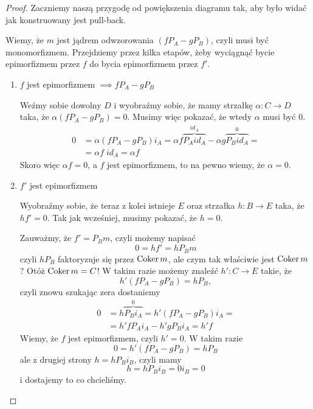 \begin{proof}
  Zaczniemy naszą przygodę od powiększenia diagramu tak, aby było widać jak konstruowany jest pull-back.

  \begin{center}\end{center}
  Wiemy, że $m$ jest jądrem odwzorowania $(fP_A-gP_B)$, czyli musi być monomorfizmem. Przejdziemy przez kilka etapów, żeby wyciągnąć bycie epimorfizmem przez $f$ do bycia epimorfizmem przez $f'$.
  \begin{enumerate}
    \item $f$ jest epimorfizmem $\implies fP_A-gP_B$

      Weźmy sobie dowolny $D$ i wyobraźmy sobie, że mamy strzałkę $\alpha:C\to D$ taka, że $\alpha(fP_A-gP_B)=0$. Musimy więc pokazać, że wtedy $\alpha$ musi być $0$.
      \begin{align*}
        0 &= \alpha(fP_A-gP_B)i_A=\alpha f\overbrace{P_Aid_A}^{id_A}-\alpha g\overbrace{P_Bid_A}^0=\\ 
          &=\alpha f\;id_A=\alpha f
      \end{align*}
      Skoro więc $\alpha f=0$, a $f$ jest epimorfizmem, to na pewno wiemy, że $\alpha=0$.
    \item $f'$ jest epimorfizmem

      Wyobraźmy sobie, że teraz z kolei istnieje $E$ oraz strzałka $h:B\to E$ taka, że $hf'=0$. Tak jak wcześniej, musimy pokazać, że $h=0$.

      Zauważmy, że $f'=P_Bm$, czyli możemy napisać
      $$0=hf'=hP_Bm$$
      czyli $hP_B$ faktoryzuje się przez $\operatorname{Coker} m$, ale czym tak właściwie jest $\operatorname{Coker} m$? Otóż $\operatorname{Coker} m=C$! W takim razie możemy znaleźć $h':C\to E$ takie, że
      $$h'(fP_A-gP_B)=hP_B,$$
      czyli znowu szukając zera dostaniemy
      \begin{align*}
        0&=h\overbrace{P_Bi_A}^0=h'(fP_A-gP_B)i_A=\\ 
         &=h'fP_Ai_A-h'gP_Bi_A=h'f
      \end{align*}
      Wiemy, że $f$ jest epimorfizmem, czyli $h'=0$. W takim razie
      $$0=h'(fP_A-gP_B)=hP_B$$
      ale z drugiej strony $h=hP_Bi_B$, czyli mamy
      $$h=hP_Bi_B=0i_B=0$$
      i dostajemy to co chcieliśmy.
  \end{enumerate}
\end{proof}
